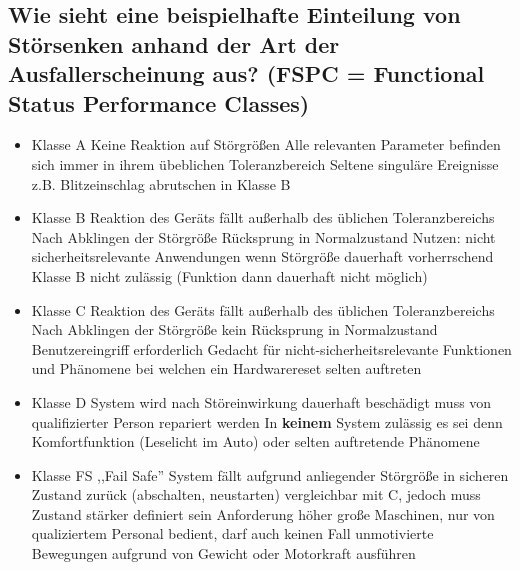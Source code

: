\subsection{Wie sieht eine beispielhafte Einteilung von Störsenken anhand der Art der Ausfallerscheinung aus? (FSPC = Functional Status Performance Classes)}
\begin{itemize}
  \item Klasse A
    \subitem Keine Reaktion auf Störgrößen
    \subitem Alle relevanten Parameter befinden sich immer in ihrem übeblichen Toleranzbereich
    \subitem Seltene singuläre Ereignisse \m{\rightarrow} z.B. Blitzeinschlag \m{\rightarrow} abrutschen in Klasse B
  \item Klasse B
    \subitem Reaktion des Geräts fällt außerhalb des üblichen Toleranzbereichs
    \subitem Nach Abklingen der Störgröße \m{\rightarrow} Rücksprung in Normalzustand
    \subitem Nutzen: nicht sicherheitsrelevante Anwendungen \m{\rightarrow} wenn Störgröße dauerhaft vorherrschend \m{\rightarrow} Klasse B nicht zulässig (Funktion dann dauerhaft nicht möglich)
  \item Klasse C
    \subitem  Reaktion des Geräts fällt außerhalb des üblichen Toleranzbereichs
    \subitem Nach Abklingen der Störgröße \m{\rightarrow} kein Rücksprung in Normalzustand \m{\rightarrow}Benutzereingriff erforderlich
    \subitem Gedacht für nicht-sicherheitsrelevante Funktionen \m{\rightarrow} und Phänomene bei welchen ein Hardwarereset selten auftreten
  \item Klasse D
    \subitem System wird nach Störeinwirkung dauerhaft beschädigt \m{\rightarrow} muss von qualifizierter Person repariert werden
    \subitem In \textbf{keinem} System zulässig es sei denn \m{\rightarrow} Komfortfunktion (Leselicht im Auto) oder selten auftretende Phänomene
  \item Klasse FS
    \subitem ,,Fail Safe''
    \subitem System fällt aufgrund anliegender Störgröße in sicheren Zustand zurück (abschalten, neustarten)
    \subitem vergleichbar mit C, jedoch muss Zustand stärker definiert sein \m{\rightarrow} Anforderung höher
    \subitem große Maschinen, nur von qualiziertem Personal bedient, darf auch keinen Fall unmotivierte Bewegungen aufgrund von Gewicht oder Motorkraft ausführen
  \end{itemize}

\pagebreak